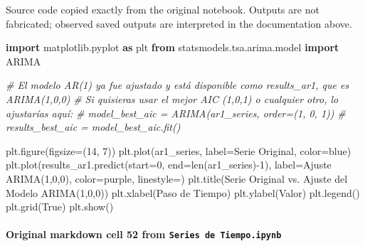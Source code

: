 \documentclass[
  11pt,
]{article}
\newenvironment{Shaded}{}{}
\newcommand{\BuiltInTok}[1]{\textcolor[rgb]{0.00,0.50,0.00}{#1}}
\newcommand{\CommentTok}[1]{\textcolor[rgb]{0.38,0.63,0.69}{\textit{#1}}}
\newcommand{\DecValTok}[1]{\textcolor[rgb]{0.25,0.63,0.44}{#1}}
\newcommand{\ImportTok}[1]{\textcolor[rgb]{0.00,0.50,0.00}{\textbf{#1}}}
\newcommand{\NormalTok}[1]{#1}
\newcommand{\OperatorTok}[1]{\textcolor[rgb]{0.40,0.40,0.40}{#1}}
\newcommand{\StringTok}[1]{\textcolor[rgb]{0.25,0.44,0.63}{#1}}
\newcommand{\VariableTok}[1]{\textcolor[rgb]{0.10,0.09,0.49}{#1}}
\begin{document}
Source code copied exactly from the original notebook. Outputs are not fabricated; observed saved outputs are interpreted in the documentation above.

\begin{Shaded}
\begin{Highlighting}[]
\ImportTok{import}\NormalTok{ matplotlib.pyplot }\ImportTok{as}\NormalTok{ plt}
\ImportTok{from}\NormalTok{ statsmodels.tsa.arima.model }\ImportTok{import}\NormalTok{ ARIMA}

\CommentTok{\# El modelo AR(1) ya fue ajustado y está disponible como results\_ar1, que es ARIMA(1,0,0)}
\CommentTok{\# Si quisieras usar el mejor AIC (1,0,1) o cualquier otro, lo ajustarías aquí:}
\CommentTok{\# model\_best\_aic = ARIMA(ar1\_series, order=(1, 0, 1))}
\CommentTok{\# results\_best\_aic = model\_best\_aic.fit()}

\NormalTok{plt.figure(figsize}\OperatorTok{=}\NormalTok{(}\DecValTok{14}\NormalTok{, }\DecValTok{7}\NormalTok{))}
\NormalTok{plt.plot(ar1\_series, label}\OperatorTok{=}\StringTok{\textquotesingle{}Serie Original\textquotesingle{}}\NormalTok{, color}\OperatorTok{=}\StringTok{\textquotesingle{}blue\textquotesingle{}}\NormalTok{)}
\NormalTok{plt.plot(results\_ar1.predict(start}\OperatorTok{=}\DecValTok{0}\NormalTok{, end}\OperatorTok{=}\BuiltInTok{len}\NormalTok{(ar1\_series)}\OperatorTok{{-}}\DecValTok{1}\NormalTok{), label}\OperatorTok{=}\StringTok{\textquotesingle{}Ajuste ARIMA(1,0,0)\textquotesingle{}}\NormalTok{, color}\OperatorTok{=}\StringTok{\textquotesingle{}purple\textquotesingle{}}\NormalTok{, linestyle}\OperatorTok{=}\StringTok{\textquotesingle{}{-}\textquotesingle{}}\NormalTok{)}
\NormalTok{plt.title(}\StringTok{\textquotesingle{}Serie Original vs. Ajuste del Modelo ARIMA(1,0,0)\textquotesingle{}}\NormalTok{)}
\NormalTok{plt.xlabel(}\StringTok{\textquotesingle{}Paso de Tiempo\textquotesingle{}}\NormalTok{)}
\NormalTok{plt.ylabel(}\StringTok{\textquotesingle{}Valor\textquotesingle{}}\NormalTok{)}
\NormalTok{plt.legend()}
\NormalTok{plt.grid(}\VariableTok{True}\NormalTok{)}
\NormalTok{plt.show()}
\end{Highlighting}
\end{Shaded}

\paragraph{\texorpdfstring{Original markdown cell 52 from \texttt{Series\ de\ Tiempo.ipynb}}{Original markdown cell 52 from Series de Tiempo.ipynb}}\label{original-markdown-cell-52-from-series-de-tiempoipynb}
\end{document}
